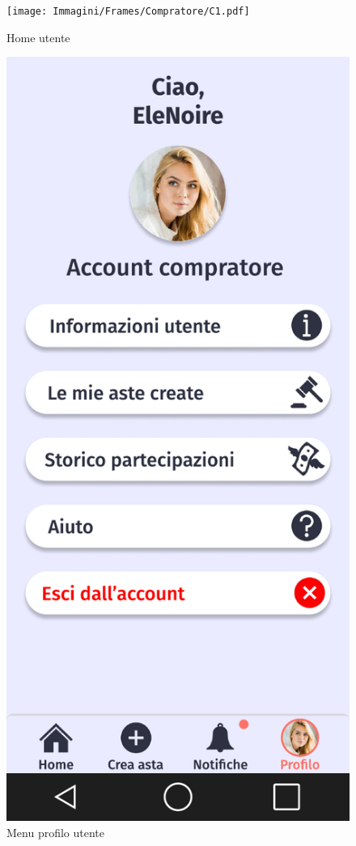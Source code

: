         \begin{figure}[!htb]
            \begin{minipage}{0.32\textwidth}
                    \centering
                    \texttt{[image: Immagini/Frames/Compratore/C1.pdf]}
                    \caption{Home utente}
            \end{minipage}\hfill
            \begin{minipage}{0.32\textwidth}
                    \centering
                    \includegraphics[width=.7\linewidth]{Immagini/Frames/Compratore/C6.pdf}
                    \caption{Menu profilo utente}
            \end{minipage}\hfill
            \begin{minipage}{0.32\textwidth}

\end{minipage}
\end{figure}
